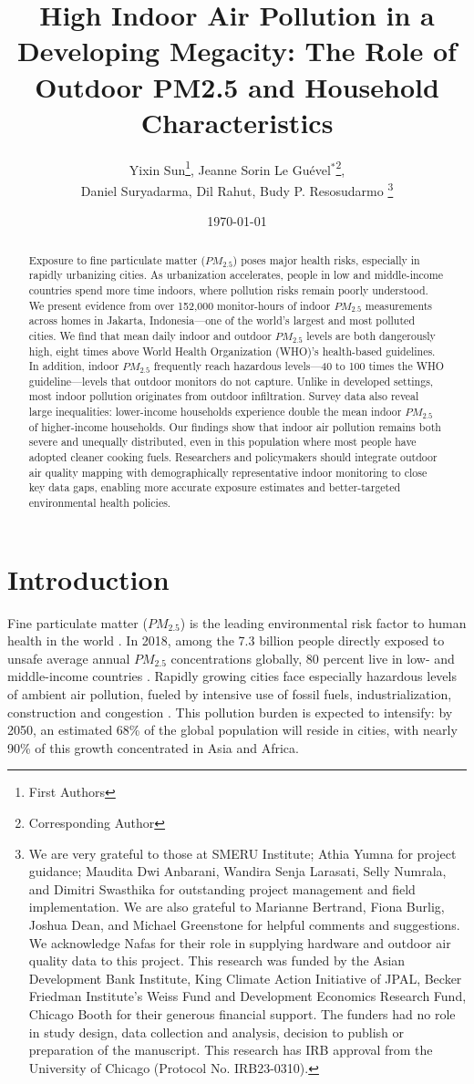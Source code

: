 \documentclass[reqno,12pt,notitlepage]{article}
\title{High Indoor Air Pollution in a Developing Megacity: The Role of Outdoor PM2.5 and Household Characteristics}
\author{Yixin Sun\footnote{First Authors}, Jeanne Sorin Le Guével$^*$\footnote{Corresponding Author}, \\ Daniel Suryadarma, Dil Rahut, Budy P. Resosudarmo \thanks{We are very grateful to those at SMERU Institute; Athia Yumna for project guidance; Maudita Dwi Anbarani, Wandira Senja Larasati, Selly Numrala, and Dimitri Swasthika for outstanding project management and field implementation. We are also grateful to Marianne Bertrand, Fiona Burlig, Joshua Dean, and Michael Greenstone for helpful comments and suggestions. We acknowledge Nafas for their role in supplying hardware and outdoor air quality data to this project. This research was funded by the Asian Development Bank Institute, King Climate Action Initiative of JPAL, Becker Friedman Institute's Weiss Fund and Development Economics Research Fund, Chicago Booth for their generous financial support. The funders had no role in study design, data collection and analysis, decision to publish or preparation of the manuscript. This research has IRB approval from the University of Chicago (Protocol No. IRB23-0310).}}}}
\date{\today}
\begin{document}
\maketitle


\begin{abstract}
Exposure to fine particulate matter ($PM_{2.5}$) poses major health risks, especially in rapidly urbanizing cities. As urbanization accelerates, people in low and middle-income countries spend more time indoors, where pollution risks remain poorly understood. We present evidence from over 152,000 monitor-hours of indoor $PM_{2.5}$ measurements across homes in Jakarta, Indonesia—one of the world’s largest and most polluted cities. We find that mean daily indoor and outdoor $PM_{2.5}$ levels are both dangerously high, eight times above World Health Organization (WHO)'s health-based guidelines. In addition, indoor  $PM_{2.5}$ frequently reach hazardous levels—40 to 100 times the WHO guideline—levels that outdoor monitors do not capture. Unlike in developed settings, most indoor pollution originates from outdoor infiltration. Survey data also reveal large inequalities: lower-income households experience double the mean indoor $PM_{2.5}$ of higher-income households. Our findings show that indoor air pollution remains both severe and unequally distributed, even in this population where most people have adopted cleaner cooking fuels. Researchers and policymakers should integrate outdoor air quality mapping with demographically representative indoor monitoring to close key data gaps, enabling more accurate exposure estimates and better-targeted environmental health policies.
\end{abstract}

\newpage
\section{Introduction}
Fine particulate matter ($PM_{2.5}$) is the leading environmental risk factor to human health in the world \citep{health_effects_institute_state_2024}. 
In 2018, among the 7.3 billion people directly exposed to unsafe average annual $PM_{2.5}$ concentrations globally, 80 percent live in low- and middle-income countries \citep{rentschler_global_2023}. 
Rapidly growing cities face especially hazardous levels of ambient air pollution, fueled by intensive use of fossil fuels, industrialization, construction and congestion \citep{manisalidis_environmental_2020}. This pollution burden is expected to intensify: by 2050, an estimated 68\% of the global population will reside in cities, with nearly 90\% of this growth concentrated in Asia and Africa. 
\end{document}
